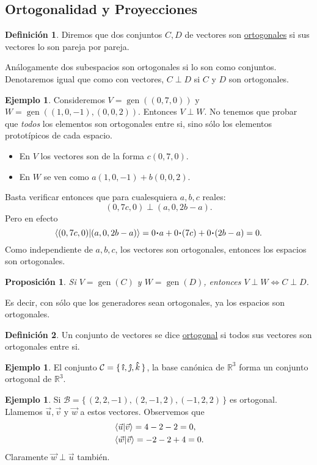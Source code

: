\documentclass[12pt]{article}
\theoremstyle{plain}
\newtheorem{Prop}[Th]{Proposición}     %
\theoremstyle{definition}
\newtheorem*{Def}{Definición}       %
\newtheorem{Ex}[Th]{Ejemplo}           %
\theoremstyle{remark}
\DeclareMathOperator{\gen}{gen}     %
\newcommand{\thickhat}[1]{\mathbf{\hat{\text{$#1$}}}}
\newcommand{\ii}{\vu{\imath}}
\newcommand{\jj}{\vu{\jmath}}
\newcommand{\kk}{\thickhat{k}}
\newcommand{\bR}{\mathbb{R}}        %
\newcommand{\cB}{\mathcal{B}}       %
\newcommand{\cC}{\mathcal{C}}       %
\renewcommand{\:}{\colon}           %
\newcommand{\un}[1]{\underline{#1}}
\renewcommand{\.}{\Cdot}                %
\newcommand{\set}[1]{\{\,#1\,\}}    %
\begin{document}
\begin{multicols}{2}
\subsection*{Ortogonalidad y Proyecciones}

\begin{Def}
  Diremos que dos conjuntos $C,D$ de vectores son \un{ortogonales} si sus vectores lo son pareja por pareja.\par 
  Análogamente dos subespacios son ortogonales si lo son como conjuntos. Denotaremos igual que como con vectores, $C\perp D$ si $C$ y $D$ son ortogonales.
\end{Def}

\begin{Ex}
  Consideremos $V=\gen((0,7,0))$ y $W=\gen((1,0,-1),(0,0,2))$. Entonces $V\perp W$. No tenemos que probar que \emph{todos} los elementos son ortogonales entre si, sino sólo los elementos prototípicos de cada espacio.
  \begin{itemize}
    \itemsep=-0.4em
    \item En $V$ los vectores son de la forma $c(0,7,0)$.
    \item En $W$ se ven como $a(1,0,-1)+b(0,0,2)$.
  \end{itemize}
  Basta verificar entonces que para cualesquiera $a,b,c$ reales:
  $$(0,7c,0)\perp(a,0,2b-a).$$
Pero en efecto
$$\braket{(0,7c,0)}{(a,0,2b-a)}=0\.a+0\.(7c)+0\.(2b-a)=0.$$
Como independiente de $a,b,c$, los vectores son ortogonales, entonces los espacios son ortogonales.
\end{Ex}

\begin{Prop}
  Si $V=\gen(C)$ y $W=\gen(D)$, entonces $V\perp W\iff C\perp D$. 
\end{Prop}

Es decir, con sólo que los generadores sean ortogonales, ya los espacios son ortogonales.

\begin{Def}
  Un conjunto de vectores se dice \un{ortogonal} si todos sus vectores son ortogonales entre si.
\end{Def}

\begin{Ex}
  El conjunto $\cC=\set{\ii,\jj,\kk}$, la base canónica de $\bR^3$ forma un conjunto ortogonal de $\bR^3$.
\end{Ex}

\begin{Ex}
  Si $\cB=\set{(2,2,-1),(2,-1,2),(-1,2,2)}$ es ortogonal. Llamemos $\vec{u},\vec{v}$ y $\vec{w}$ a estos vectores. Observemos que 
  \begin{align*}
    &\braket{\vec{u}}{\vec{v}}=4-2-2=0,\\
    &\braket{\vec{w}}{\vec{v}}=-2-2+4=0.
  \end{align*}
  Claramente $\vec{w}\perp\vec{u}$ también.
\end{Ex}


\end{multicols}
\end{document}
